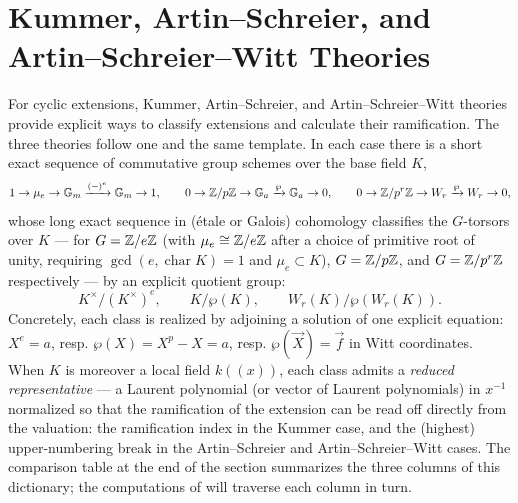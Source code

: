 
\section{Kummer, Artin--Schreier, and Artin--Schreier--Witt Theories}\label{section:cyclic_extension_theories}

For cyclic extensions, Kummer, Artin--Schreier, and Artin--Schreier--Witt
theories provide explicit ways to classify extensions and calculate their
ramification. The three theories follow one and the same template. In each
case there is a short exact sequence of commutative group schemes over the
base field $K$,
\[
    1 \to \mu_e \to \mathbb{G}_m \xrightarrow{(-)^e} \mathbb{G}_m \to 1,
    \qquad
    0 \to \mathbb{Z}/p\mathbb{Z} \to \mathbb{G}_a \xrightarrow{\wp} \mathbb{G}_a \to 0,
    \qquad
    0 \to \mathbb{Z}/p^r\mathbb{Z} \to W_r \xrightarrow{\wp} W_r \to 0,
\]
whose long exact sequence in (\'etale or Galois) cohomology classifies the
$G$-torsors over $K$ --- for $G = \mathbb{Z}/e\mathbb{Z}$ (with $\mu_e \cong \mathbb{Z}/e\mathbb{Z}$ after a
choice of primitive root of unity, requiring $\gcd(e, \operatorname{char} K) = 1$
and $\mu_e \subset K$), $G = \mathbb{Z}/p\mathbb{Z}$, and $G = \mathbb{Z}/p^r\mathbb{Z}$ respectively --- by
an explicit quotient group:
\[
    K^\times/(K^\times)^e,
    \qquad
    K/\wp(K),
    \qquad
    W_r(K)/\wp(W_r(K)).
\]
Concretely, each class is realized by adjoining a solution of one explicit
equation: $X^e = a$, resp. $\wp(X) = X^p - X = a$, resp.
$\wp(\vec X) = \vec f$ in Witt coordinates.
When $K$ is moreover a local field $k((x))$, each class admits a
\emph{reduced representative} --- a Laurent polynomial (or vector of Laurent
polynomials) in $x^{-1}$ normalized so that the ramification of the extension
can be read off directly from the valuation: the ramification index in the
Kummer case, and the (highest) upper-numbering break in the Artin--Schreier
and Artin--Schreier--Witt cases. The comparison table at the end of the
section summarizes the three columns of this dictionary; the computations of
 will traverse each column in
turn.

